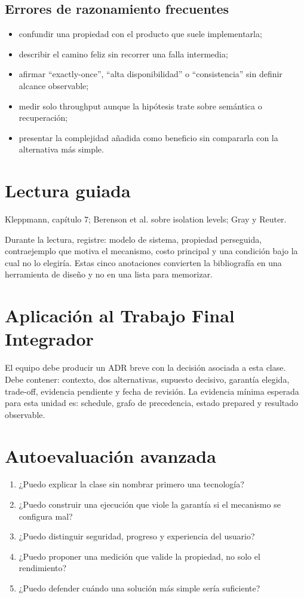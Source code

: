 \documentclass[variant=apuntes,cover=institutional,mode=screen]{ua-engineering-v6-article}
\begin{document}
\subsection{Errores de razonamiento frecuentes}
\begin{itemize}
\item confundir una propiedad con el producto que suele implementarla;
\item describir el camino feliz sin recorrer una falla intermedia;
\item afirmar ``exactly-once'', ``alta disponibilidad'' o ``consistencia'' sin definir alcance observable;
\item medir solo throughput aunque la hipótesis trate sobre semántica o recuperación;
\item presentar la complejidad añadida como beneficio sin compararla con la alternativa más simple.
\end{itemize}

\section{Lectura guiada}
Kleppmann, capítulo 7; Berenson et al. sobre isolation levels; Gray y Reuter.

Durante la lectura, registre: modelo de sistema, propiedad perseguida, contraejemplo que motiva el mecanismo, costo principal y una condición bajo la cual no lo elegiría. Estas cinco anotaciones convierten la bibliografía en una herramienta de diseño y no en una lista para memorizar.

\section{Aplicación al Trabajo Final Integrador}
El equipo debe producir un ADR breve con la decisión asociada a esta clase. Debe contener: contexto, dos alternativas, supuesto decisivo, garantía elegida, trade-off, evidencia pendiente y fecha de revisión. La evidencia mínima esperada para esta unidad es: schedule, grafo de precedencia, estado prepared y resultado observable.

\section{Autoevaluación avanzada}
\begin{enumerate}
\item ¿Puedo explicar la clase sin nombrar primero una tecnología?
\item ¿Puedo construir una ejecución que viole la garantía si el mecanismo se configura mal?
\item ¿Puedo distinguir seguridad, progreso y experiencia del usuario?
\item ¿Puedo proponer una medición que valide la propiedad, no solo el rendimiento?
\item ¿Puedo defender cuándo una solución más simple sería suficiente?
\end{enumerate}
\end{document}
